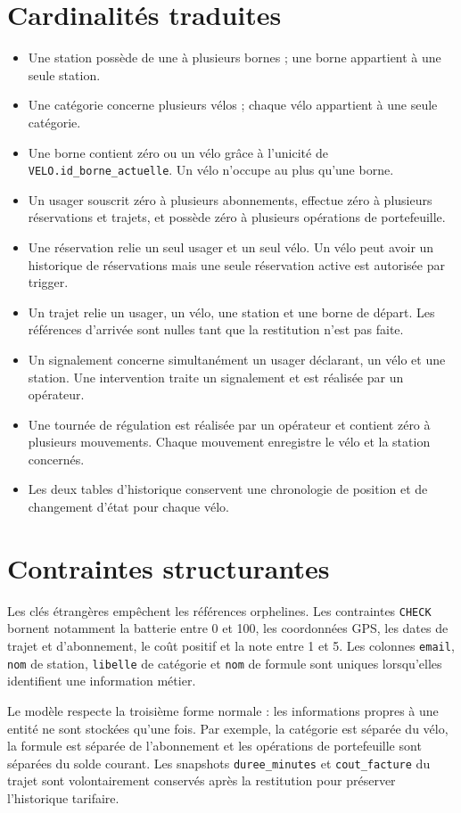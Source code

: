 \documentclass[11pt,a4paper]{article}
\begin{document}
\section{Cardinalités traduites}
\begin{itemize}
  \item Une station possède de une à plusieurs bornes ; une borne appartient à une seule station.
  \item Une catégorie concerne plusieurs vélos ; chaque vélo appartient à une seule catégorie.
  \item Une borne contient zéro ou un vélo grâce à l'unicité de \texttt{VELO.id\_borne\_actuelle}. Un vélo n'occupe au plus qu'une borne.
  \item Un usager souscrit zéro à plusieurs abonnements, effectue zéro à plusieurs réservations et trajets, et possède zéro à plusieurs opérations de portefeuille.
  \item Une réservation relie un seul usager et un seul vélo. Un vélo peut avoir un historique de réservations mais une seule réservation active est autorisée par trigger.
  \item Un trajet relie un usager, un vélo, une station et une borne de départ. Les références d'arrivée sont nulles tant que la restitution n'est pas faite.
  \item Un signalement concerne simultanément un usager déclarant, un vélo et une station. Une intervention traite un signalement et est réalisée par un opérateur.
  \item Une tournée de régulation est réalisée par un opérateur et contient zéro à plusieurs mouvements. Chaque mouvement enregistre le vélo et la station concernés.
  \item Les deux tables d'historique conservent une chronologie de position et de changement d'état pour chaque vélo.
\end{itemize}

\section{Contraintes structurantes}
Les clés étrangères empêchent les références orphelines. Les contraintes \texttt{CHECK} bornent notamment la batterie entre 0 et 100, les coordonnées GPS, les dates de trajet et d'abonnement, le coût positif et la note entre 1 et 5. Les colonnes \texttt{email}, \texttt{nom} de station, \texttt{libelle} de catégorie et \texttt{nom} de formule sont uniques lorsqu'elles identifient une information métier.

Le modèle respecte la troisième forme normale : les informations propres à une entité ne sont stockées qu'une fois. Par exemple, la catégorie est séparée du vélo, la formule est séparée de l'abonnement et les opérations de portefeuille sont séparées du solde courant. Les snapshots \texttt{duree\_minutes} et \texttt{cout\_facture} du trajet sont volontairement conservés après la restitution pour préserver l'historique tarifaire.
\end{document}
